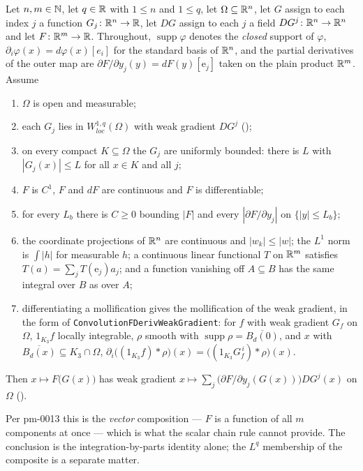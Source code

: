 \begin{helper}
Let $n,m\in\mathbb{N}$, let $q\in\mathbb{R}$ with $1\le n$ and $1\le q$, let
$\Omega\subseteq\mathbb{R}^n$, let $G$ assign to each index $j$ a function
$G_j\colon\mathbb{R}^n\to\mathbb{R}$, let $DG$ assign to each $j$ a field
$DG^j\colon\mathbb{R}^n\to\mathbb{R}^n$ and let $F\colon\mathbb{R}^m\to\mathbb{R}$.  Throughout,
$\operatorname{supp}\varphi$ denotes the \emph{closed} support of $\varphi$,
$\partial_i\varphi(x)=d\varphi(x)[e_i]$ for the standard basis of $\mathbb{R}^n$, and
the partial derivatives of the outer map are
$\partial F/\partial y_j(y)=dF(y)[\mathrm{e}_j]$ taken on the plain product
$\mathbb{R}^m$.  Assume
\begin{enumerate}
\item[(H1)] $\Omega$ is open and measurable;
\item[(H2)] each $G_j$ lies in $W^{1,q}_{loc}(\Omega)$ with weak gradient
  $DG^j$ ();
\item[(H3)] on every compact $K\subseteq\Omega$ the $G_j$ are uniformly
  bounded: there is $L$ with $|G_j(x)|\le L$ for all $x\in K$ and all $j$;
\item[(H4)] $F$ is $C^1$, $F$ and $dF$ are continuous and $F$ is
  differentiable;
\item[(H5)] for every $L_b$ there is $C\ge0$ bounding $|F|$ and every
  $|\partial F/\partial y_j|$ on $\{|y|\le L_b\}$;
\item[(H6)] the coordinate projections of $\mathbb{R}^n$ are continuous and
  $|w_k|\le|w|$; the $L^1$ norm is $\int|h|$ for measurable $h$; a continuous
  linear functional $T$ on $\mathbb{R}^m$ satisfies
  $T(a)=\sum_jT(\mathrm{e}_j)a_j$; and a function vanishing off
  $A\subseteq B$ has the same integral over $B$ as over $A$;
\item[(H7)] differentiating a mollification gives the mollification of the weak
  gradient, in the form of \texttt{ConvolutionFDerivWeakGradient}: for $f$
  with weak gradient $G_f$ on $\Omega$, $1_{K_3}f$ locally integrable, $\rho$
  smooth with $\operatorname{supp}\rho=\overline{B_d(0)}$, and $x$ with
  $\overline{B_d(x)}\subseteq K_3\cap\Omega$,
  $\partial_i\bigl((1_{K_3}f)*\rho\bigr)(x)=\bigl((1_{K_3}G_f^{\,i})*\rho\bigr)(x)$.
\end{enumerate}
Then $x\mapsto F\bigl(G(x)\bigr)$ has weak gradient
$x\mapsto\sum_j\bigl(\partial F/\partial y_j(G(x))\bigr)DG^j(x)$ on $\Omega$
().

Per pm-0013 this is the \emph{vector} composition --- $F$ is a function of all
$m$ components at once --- which is what the scalar chain rule cannot provide.
The conclusion is the integration-by-parts identity alone; the $L^q$ membership
of the composite is a separate matter.
\end{helper}
